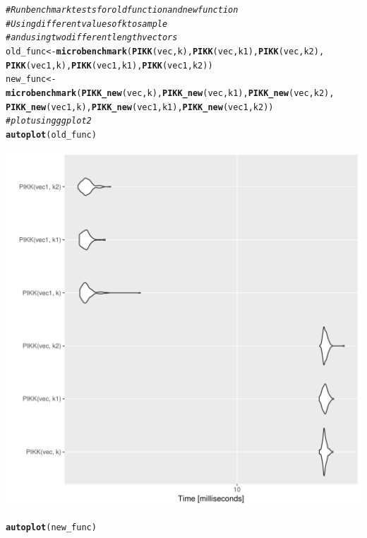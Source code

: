 \documentclass{article}\usepackage[]{graphicx}\usepackage[]{color}
\makeatletter
\def\maxwidth{ %
  \ifdim\Gin@nat@width>\linewidth
    \linewidth
  \else
    \Gin@nat@width
  \fi
}
\newcommand{\hlcom}[1]{\textcolor[rgb]{0.678,0.584,0.686}{\textit{#1}}}%
\newcommand{\hlstd}[1]{\textcolor[rgb]{0.345,0.345,0.345}{#1}}%
\newcommand{\hlkwb}[1]{\textcolor[rgb]{0.69,0.353,0.396}{#1}}%
\newcommand{\hlkwd}[1]{\textcolor[rgb]{0.737,0.353,0.396}{\textbf{#1}}}%
\newenvironment{kframe}{%
 \def\at@end@of@kframe{}%
 \ifinner\ifhmode%
  \def\at@end@of@kframe{\end{minipage}}%
  \begin{minipage}{\columnwidth}%
 \fi\fi%
 \def\FrameCommand##1{\hskip\@totalleftmargin \hskip-\fboxsep
 \colorbox{shadecolor}{##1}\hskip-\fboxsep
     \hskip-\linewidth \hskip-\@totalleftmargin \hskip\columnwidth}%
 \MakeFramed {\advance\hsize-\width
   \@totalleftmargin\z@ \linewidth\hsize
   \@setminipage}}%
 {\par\unskip\endMakeFramed%
 \at@end@of@kframe}
\newenvironment{knitrout}{}{} %
\makeatother
\begin{document}
\begin{knitrout}
\begin{kframe}
\begin{alltt}
\hlcom{#Run benchmark tests for old function and new function}
\hlcom{#Using different values of k to sample}
\hlcom{#and using two different length vectors}
\hlstd{old_func} \hlkwb{<-} \hlkwd{microbenchmark}\hlstd{(}\hlkwd{PIKK}\hlstd{(vec, k),} \hlkwd{PIKK}\hlstd{(vec, k1),} \hlkwd{PIKK}\hlstd{(vec,k2),}
                      \hlkwd{PIKK}\hlstd{(vec1,k),} \hlkwd{PIKK}\hlstd{(vec1,k1),} \hlkwd{PIKK}\hlstd{(vec1,k2))}
\hlstd{new_func} \hlkwb{<-} \hlkwd{microbenchmark}\hlstd{(}\hlkwd{PIKK_new}\hlstd{(vec, k),} \hlkwd{PIKK_new}\hlstd{(vec, k1),} \hlkwd{PIKK_new}\hlstd{(vec,k2),}
                      \hlkwd{PIKK_new}\hlstd{(vec1,k),} \hlkwd{PIKK_new}\hlstd{(vec1,k1),} \hlkwd{PIKK_new}\hlstd{(vec1,k2))}
\hlcom{#plot using ggplot2}
\hlkwd{autoplot}\hlstd{(old_func)}
\end{alltt}
\end{kframe}
\includegraphics[width=\maxwidth]{figure/unnamed-chunk-12-1} 
\begin{kframe}\begin{alltt}
\hlkwd{autoplot}\hlstd{(new_func)}
\end{alltt}
\end{kframe}

\end{knitrout}
\end{document}
